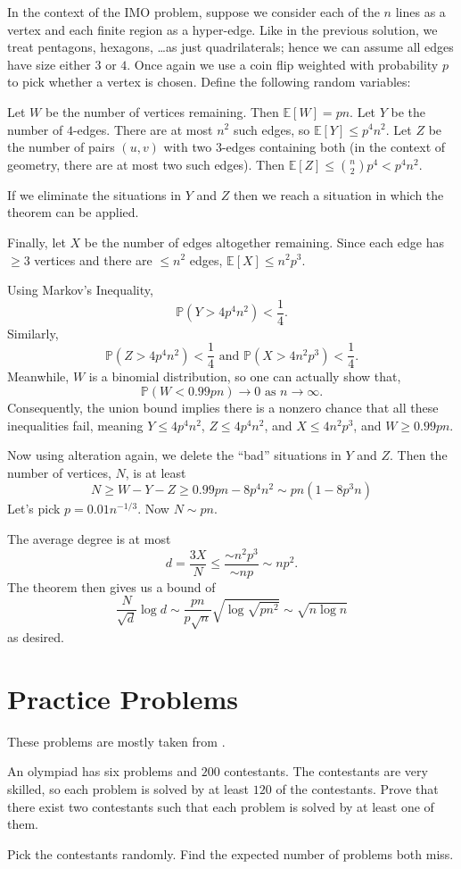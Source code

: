 \documentclass[11pt]{scrartcl}
\newcommand\EE{\mathbb E}
\newcommand\PP{\mathbb P}
\begin{document}
In the context of the IMO problem, suppose we consider each of the $n$ lines as a vertex
and each finite region as a hyper-edge.
Like in the previous solution, we treat pentagons, hexagons, \dots as just quadrilaterals;
hence we can assume all edges have size either $3$ or $4$.
Once again we use a coin flip weighted with probability $p$ to pick whether a vertex is chosen.
Define the following random variables:
\begin{itemize}
  \ii Let $W$ be the number of vertices remaining. Then $\EE[W] = pn$.
  \ii Let $Y$ be the number of $4$-edges. There are at most $n^2$ such edges, so $\EE[Y] \le p^4n^2$.
  \ii Let $Z$ be the number of pairs $(u,v)$ with two $3$-edges containing both (in the context of geometry, there are at most two such edges).
  Then $\EE[Z] \le \binom n2 p^4 < p^4n^2$.
\end{itemize}
If we eliminate the situations in $Y$ and $Z$ then we reach a situation in which the theorem can be applied.

Finally, let $X$ be the number of edges altogether remaining. Since each edge has $\ge 3$ vertices and there are $\le n^2$ edges, $\EE[X] \le n^2p^3$.

Using Markov's Inequality, \[ \PP(Y > 4p^4n^2) < \frac 14. \] Similarly, \[ \PP(Z > 4p^4n^2) < \frac 14 \text{ and } \PP(X > 4n^2p^3) < \frac 14. \]
Meanwhile, $W$ is a binomial distribution, so one can actually show that, \[ \PP(W < 0.99pn) \to 0 \text{ as } n \to \infty. \]
Consequently, the union bound implies there is a nonzero chance that all these inequalities fail, meaning $Y \le 4p^4n^2$, $Z \le 4p^4n^2$, and $X \le 4n^2p^3$, and $W \ge 0.99pn$.

Now using alteration again, we delete the ``bad'' situations in $Y$ and $Z$.  Then the number of vertices, $N$, is at least
\[ N \ge W - Y - Z \ge 0.99 pn - 8p^4n^2 \sim pn(1-8p^3n) \]
Let's pick $p = 0.01n^{-1/3}$.  Now $N \sim pn$.

The average degree is at most \[ d = \frac{3X}{N} \le \frac{\sim n^2p^3}{\sim np} \sim np^2. \]
The theorem then gives us a bound of
\[ \frac{N}{\sqrt{d}} \log d \sim \frac{pn}{p\sqrt n} \sqrt{\log \sqrt{pn^2}} \sim \sqrt{n \log n} \]
as desired.


\section{Practice Problems}
These problems are mostly taken from \cite{ravi,poshen}.

\begin{problem}
  [IMC 2002] An olympiad has six problems and $200$ contestants.  The contestants are very skilled,
  so each problem is solved by at least $120$ of the contestants.
  Prove that there exist two contestants such that each problem is solved by at least one of them.
  \begin{sketch}
    Pick the contestants randomly. Find the expected number of problems both miss.
  \end{sketch}
\end{problem}
\end{document}
